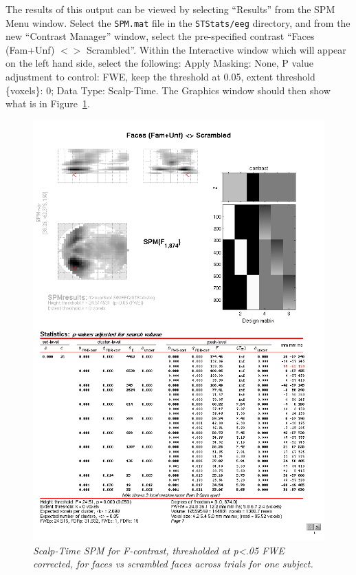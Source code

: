 The results of this output can be viewed by selecting ``Results'' from the SPM Menu window. Select the \texttt{SPM.mat} file in the \texttt{STStats/eeg} directory, and from the new ``Contrast Manager'' window, select the pre-specified contrast ``Faces (Fam+Unf) \(<>\) Scrambled''.  Within the Interactive window which will appear on the left hand side, select the following:  Apply Masking: None, P value adjustment to control: FWE, keep the threshold at 0.05, extent threshold \{voxels\}: 0; Data Type: Scalp-Time. The Graphics window should then show what is in Figure~\ref{multi:fig:6}.

\begin{figure}
\begin{center}
\includegraphics[width=150mm]{multi/figures/figure6}
\caption{\em Scalp-Time SPM for F-contrast, thresholded at p<.05 FWE corrected, for faces vs scrambled faces across trials for one subject. \label{multi:fig:6}}
\end{center}
\end{figure}

